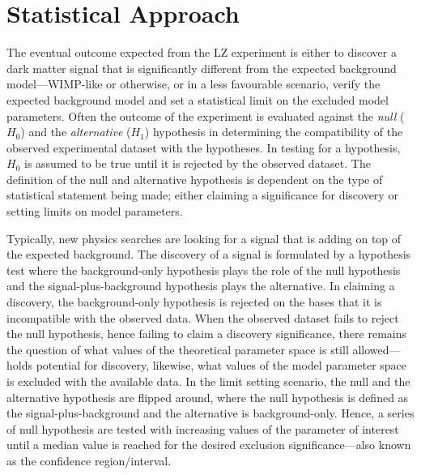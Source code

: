 \section{Statistical Approach}
\label{sec:lz_stats}

The eventual outcome expected from the LZ experiment is either to discover a dark matter signal that is significantly different from the expected background model---WIMP-like or otherwise, or in a less favourable scenario, verify the expected background model and set a statistical limit on the excluded model parameters. Often the outcome of the experiment is evaluated against the \textit{null} ($H_{0}$) and the \textit{alternative} ($H_{1}$) hypothesis in determining the compatibility of the observed experimental dataset with the hypotheses. In testing for a hypothesis, $H_{0}$ is assumed to be true until it is rejected by the observed dataset. The definition of the null and alternative hypothesis is dependent on the type of statistical statement being made; either claiming a significance for discovery or setting limits on model parameters. 

Typically, new physics searches are looking for a signal that is adding on top of the expected background. The discovery of a signal is formulated by a hypothesis test where the background-only hypothesis plays the role of the null hypothesis and the signal-plus-background hypothesis plays the alternative. In claiming a discovery, the background-only hypothesis is rejected on the bases that it is incompatible with the observed data. When the observed dataset fails to reject the null hypothesis, hence failing to claim a discovery significance, there remains the question of what values of the theoretical parameter space is still allowed---holds potential for discovery, likewise, what values of the model parameter space is excluded with the available data. In the limit setting scenario, the null and the alternative hypothesis are flipped around, where the null hypothesis is defined as the signal-plus-background and the alternative is background-only. Hence, a series of null hypothesis are tested with increasing values of the parameter of interest until a median value is reached for the desired exclusion significance---also known as the confidence region/interval. 

